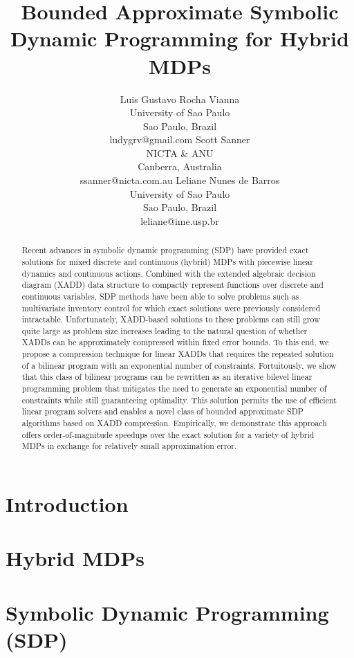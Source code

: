 \documentclass{article}
\title{	Bounded Approximate Symbolic Dynamic Programming for Hybrid MDPs }
\author{Luis Gustavo Rocha Vianna\\
University of Sao Paulo\\
Sao Paulo, Brazil\\
ludygrv@gmail.com
\And
Scott Sanner\\
NICTA \& ANU\\
Canberra, Australia\\
ssanner@nicta.com.au
\And
Leliane Nunes de Barros\\
University of Sao Paulo\\
Sao Paulo, Brazil\\
leliane@ime.usp.br}
\begin{document}
\maketitle

\begin{abstract}
Recent advances in symbolic dynamic programming (SDP) have provided
exact solutions for mixed discrete and continuous (hybrid) MDPs with
piecewise linear dynamics and continuous actions. Combined with the
extended algebraic decision diagram (XADD) data structure to compactly
represent functions over discrete and continuous variables,
SDP methods have been able to solve problems such as
multivariate inventory control for which exact solutions were
previously considered intractable. Unfortunately, XADD-based solutions
to these problems can still grow quite large as problem size increases
leading to the natural question of whether XADDs can be approximately
compressed within fixed error bounds. To this end, we propose a
compression technique for linear XADDs that requires the repeated
solution of a bilinear program with an exponential number of
constraints. Fortuitously, we show that this class of bilinear
programs can be rewritten as an iterative bilevel linear programming
problem that mitigates the need to generate an exponential number of
constraints while still guaranteeing optimality. This solution permits
the use of efficient linear program solvers and enables a novel class
of bounded approximate SDP algorithms based on XADD
compression. Empirically, we demonstrate this approach offers
order-of-magnitude speedups over the exact solution for a variety of
hybrid MDPs in exchange for relatively small approximation error.
\end{abstract}

\section{Introduction}



\section{Hybrid MDPs}



\section{Symbolic Dynamic Programming (SDP)}
\end{document}
